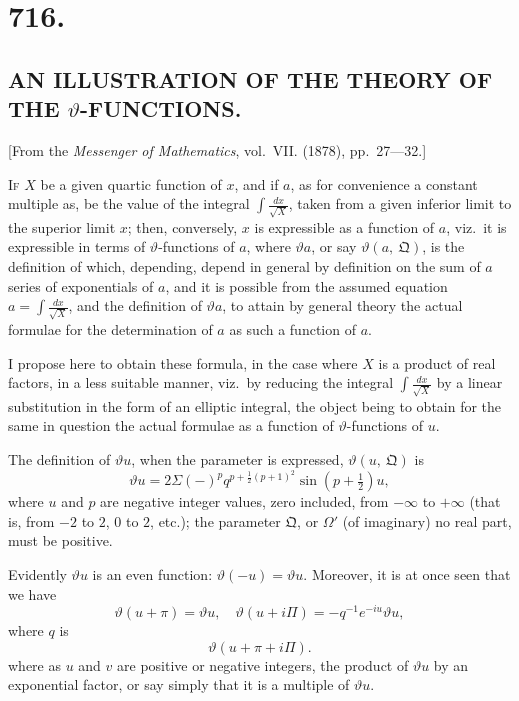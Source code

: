 \documentclass[11pt,a4paper]{book}
\begin{document}
\section*{716.}
\subsection*{AN ILLUSTRATION OF THE THEORY OF THE $\vartheta$-FUNCTIONS.}

\begin{center}
\small [From the \textit{Messenger of Mathematics}, vol.~VII. (1878), pp.~27---32.]
\end{center}

\medskip

\textsc{If} $X$ be a given quartic function of $x$, and if $a$, as for convenience a constant multiple as, be the value of the integral $\int\frac{dx}{\sqrt{X}}$, taken from a given inferior limit to the superior limit $x$; then, conversely, $x$ is expressible as a function of $a$, viz.\ it is expressible in terms of $\vartheta$-functions of $a$, where $\vartheta a$, or say $\vartheta(a,\ \mathfrak{Q})$, is the definition of which, depending, depend in general by definition on the sum of $a$ series of exponentials of $a$, and it is possible from the assumed equation $a=\int\frac{dx}{\sqrt{X}}$, and the definition of $\vartheta a$, to attain by general theory the actual formulae for the determination of $a$ as such a function of $a$.

I propose here to obtain these formula, in the case where $X$ is a product of real factors, in a less suitable manner, viz.\ by reducing the integral $\int\frac{dx}{\sqrt{X}}$ by a linear substitution in the form of an elliptic integral, the object being to obtain for the same in question the actual formulae as a function of $\vartheta$-functions of $u$.

The definition of $\vartheta u$, when the parameter is expressed, $\vartheta(u,\ \mathfrak{Q})$ is
\[
\vartheta u=2\Sigma(-)^p q^{p+\frac{1}{2}(p+1)^2}\sin(p+\tfrac{1}{2})u,
\]
where $u$ and $p$ are negative integer values, zero included, from $-\infty$ to $+\infty$ (that is, from $-2$ to $2$, $0$ to $2$, etc.); the parameter $\mathfrak{Q}$, or $\Omega'$ (of imaginary) no real part, must be positive.


\newpage
Evidently $\vartheta u$ is an even function: $\vartheta(-u)=\vartheta u$. Moreover, it is at once seen that we have
\[
\vartheta(u+\pi)=\vartheta u,\quad \vartheta(u+i\Pi)=-q^{-1}e^{-iu}\vartheta u,
\]
where $q$ is
\[
\vartheta(u+\pi+i\Pi).
\]
where as $u$ and $v$ are positive or negative integers, the product of $\vartheta u$ by an exponential factor, or say simply that it is a multiple of $\vartheta u$.
\end{document}
